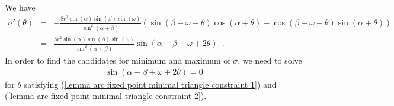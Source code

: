 \documentclass[11pt, oneside]{article}
\begin{document}
We have
\begin{eqnarray*}
\sigma'(\theta) &=& -\frac{8r^2\sin(\alpha)\sin(\beta)\sin(\omega)}{\sin^2\!(\alpha+\beta)}(\sin(\beta-\omega-\theta)\cos(\alpha+\theta) - \cos(\beta-\omega-\theta)\sin(\alpha+\theta))\\
&=& \frac{8r^2\sin(\alpha)\sin(\beta)\sin(\omega)}{\sin^2\!(\alpha+\beta)}\sin(\alpha-\beta+\omega+2\theta) \enspace.
\end{eqnarray*}
In order to find the candidates for minimum and maximum of $\sigma$,
we need to solve
\begin{eqnarray}
\label{lemma arc fixed point minimal triangle equation 1}
\sin(\alpha-\beta+\omega+2\theta) = 0
\end{eqnarray}
for $\theta$ satisfying (\ref{lemma arc fixed point minimal triangle constraint 1})
and (\ref{lemma arc fixed point minimal triangle constraint 2}).
\end{document}
